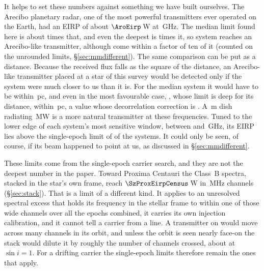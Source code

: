 It helps to set these numbers against something we have built ourselves.
The Arecibo planetary radar, one of the most powerful transmitters ever
operated on the Earth, had an EIRP of about $\AroEirp$\,W at
\AroFreqGHz\,GHz. The median limit found here is about \AroMedMult{} times
that, and even the deepest is \AroDeepMult{} times it, so
\AroNSysBelowWord{} system reaches an Arecibo-like transmitter, although
\AroNSysTen{} come within a factor of ten of it (counted on the unrounded
limits, \S\ref{sec:mmdifferent}). The same comparison can be
put as a distance. Because the received flux falls as the square of the
distance, an Arecibo-like transmitter placed at a star of this survey would
be detected only if the system were much closer to us than it is. For the
median system it would have to be within \AroDistMedPc\,pc, and even in the
most favourable case, \AroDistMaxStar, whose limit is deep for its distance,
within \AroDistMaxPc\,pc, a value whose decorrelation correction is
\AroDistMaxBasis. A \BenchDiam\,m dish radiating \BenchPowerMW\,MW is
a more natural transmitter at these frequencies. Tuned to the lower edge of
each system's most sensitive window, between \BenchTunedFreqLo{} and
\BenchTunedFreqHi\,GHz, its EIRP lies above the single-epoch limit of
\BenchNSysTuned{} of the \NSysALimSum{} systems. It could only be seen, of
course, if its beam happened to point at us, as discussed in
\S\ref{sec:mmdifferent}.

These limits come from the single-epoch carrier search, and they are not the
deepest number in the paper. Toward Proxima Centauri the Class~B spectra,
stacked in the star's own frame, reach $\SzProxEirpCensus$\,W in
\ChanBModeMHz\,MHz channels (\S\ref{sec:stack}). That is a limit of a
different kind. It applies to an unresolved spectral excess that holds its
frequency in the stellar frame to within one of those wide channels over all
the epochs combined, it carries its own injection calibration, and it cannot
tell a carrier from a line. A transmitter on \PxPlanet{} would move across
many channels in its orbit, and unless the orbit is seen nearly face-on the
stack would dilute it by roughly the number of channels crossed, about
\PxNChanWalk{} at $\sin i=1$. For a drifting carrier the single-epoch
limits therefore remain the ones that apply.

